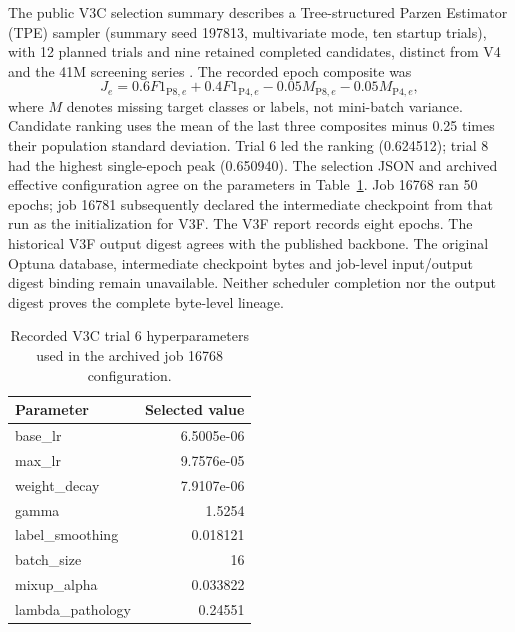 \documentclass[life,article,submit,moreauthors]{Definitions/mdpi}
\begin{document}
The public V3C selection summary describes a Tree-structured Parzen Estimator (TPE) sampler (summary seed 197813, multivariate mode, ten startup trials), with 12 planned trials and nine retained completed candidates, distinct from V4 and the 41M screening series \citep{Akiba2019Optuna}. The recorded epoch composite was
\begin{equation}
J_e=0.6F1_{\mathrm{P8},e}+0.4F1_{\mathrm{P4},e}-0.05M_{\mathrm{P8},e}-0.05M_{\mathrm{P4},e},
\end{equation}
where $M$ denotes missing target classes or labels, not mini-batch variance. Candidate ranking uses the mean of the last three composites minus 0.25 times their population standard deviation. Trial 6 led the ranking (0.624512); trial 8 had the highest single-epoch peak (0.650940). The selection JSON and archived effective configuration agree on the parameters in Table~\ref{tab:optuna}. Job 16768 ran 50 epochs; job 16781 subsequently declared the intermediate checkpoint from that run as the initialization for V3F. The V3F report records eight epochs. The historical V3F output digest agrees with the published backbone. The original Optuna database, intermediate checkpoint bytes and job-level input/output digest binding remain unavailable. Neither scheduler completion nor the output digest proves the complete byte-level lineage.

\begin{table}[htbp]
\caption{Recorded V3C trial 6 hyperparameters used in the archived job 16768 configuration.\label{tab:optuna}}
\centering
\small
\begin{tabular}{lr}
\toprule
\textbf{Parameter} & \textbf{Selected value} \\
\midrule
base\_lr & 6.5005e-06 \\
max\_lr & 9.7576e-05 \\
weight\_decay & 7.9107e-06 \\
gamma & 1.5254 \\
label\_smoothing \citep{Szegedy2016Rethinking} & 0.018121 \\
batch\_size & 16 \\
mixup\_alpha & 0.033822 \\
lambda\_pathology & 0.24551 \\
\bottomrule
\end{tabular}
\end{table}
\end{document}
